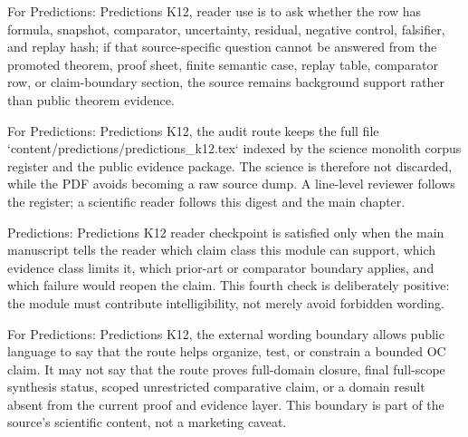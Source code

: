 For Predictions: Predictions K12, reader use is to ask whether the row has formula, snapshot, comparator, uncertainty, residual, negative control, falsifier, and replay hash; if that source-specific question cannot be answered from the promoted theorem, proof sheet, finite semantic case, replay table, comparator row, or claim-boundary section, the source remains background support rather than public theorem evidence.


For Predictions: Predictions K12, the audit route keeps the full file `content/predictions/predictions\_k12.tex` indexed by the science monolith corpus register and the public evidence package. The science is therefore not discarded, while the PDF avoids becoming a raw source dump. A line-level reviewer follows the register; a scientific reader follows this digest and the main chapter.


Predictions: Predictions K12 reader checkpoint is satisfied only when the main manuscript tells the reader which claim class this module can support, which evidence class limits it, which prior-art or comparator boundary applies, and which failure would reopen the claim. This fourth check is deliberately positive: the module must contribute intelligibility, not merely avoid forbidden wording.


For Predictions: Predictions K12, the external wording boundary allows public language to say that the route helps organize, test, or constrain a bounded OC claim. It may not say that the route proves full-domain closure, final full-scope synthesis status, scoped unrestricted comparative claim, or a domain result absent from the current proof and evidence layer. This boundary is part of the source's scientific content, not a marketing caveat.
